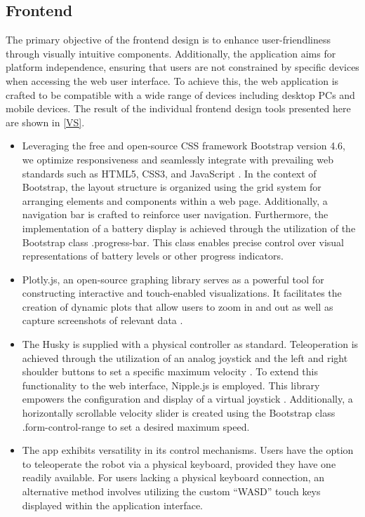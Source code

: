 \documentclass[conference]{IEEEtran}
\begin{document}
\subsection{Frontend}
The primary objective of the frontend design is to enhance user-friendliness through visually intuitive components. Additionally, the application aims for platform independence, ensuring that users are not constrained by specific devices when accessing the web user interface. 
To achieve this, the web application is crafted to be compatible with a wide range of devices including desktop PCs and mobile devices. The result of the individual frontend design tools presented here are shown in \ref{VS}.
\begin{itemize}
\item Leveraging the free and open-source CSS framework Bootstrap version 4.6, we optimize responsiveness and seamlessly integrate with prevailing web standards such as HTML5, CSS3, and JavaScript \cite{bootstrap}. 
In the context of Bootstrap, the layout structure is organized using the grid system for arranging elements and components within a web page. 
Additionally, a navigation bar is crafted to reinforce user navigation.
Furthermore, the implementation of a battery display is achieved through the utilization of the Bootstrap class .progress-bar. 
This class enables precise control over visual representations of battery levels or other progress indicators.
\item Plotly.js, an open-source graphing library serves as a powerful tool for constructing interactive and touch-enabled visualizations. It facilitates the creation of dynamic plots that allow users to zoom in and out as well as capture screenshots of relevant data \cite{plotly}.
\item The Husky is supplied with a physical controller as standard. Teleoperation is achieved through the utilization of an analog joystick and the left and right shoulder buttons to set a specific maximum velocity \cite{huskydriving}.
To extend this functionality to the web interface, Nipple.js is employed. This library empowers the configuration and display of a virtual joystick \cite{nipplejs}. Additionally, a horizontally scrollable velocity slider is created using the Bootstrap class .form-control-range to set a desired maximum speed.
\item The app exhibits versatility in its control mechanisms. Users have the option to teleoperate the robot via a physical keyboard, provided they have one readily available. For users lacking a physical keyboard connection, an alternative method involves utilizing the custom “WASD” touch keys displayed within the application interface. 

\end{itemize}
\end{document}
